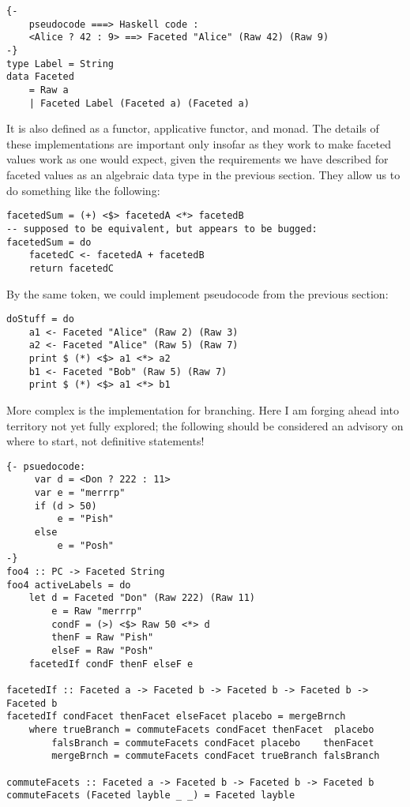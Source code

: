 \documentclass[12pt,a4paper]{article}
\begin{document}
	\lstset{language=Haskell}
	\begin{lstlisting}
{- 
	pseudocode ===> Haskell code :
	<Alice ? 42 : 9> ==> Faceted "Alice" (Raw 42) (Raw 9) 
-}
type Label = String
data Faceted
	= Raw a
	| Faceted Label (Faceted a) (Faceted a)
	\end{lstlisting}

	It is also defined as a functor, applicative functor, and monad. The details of these implementations are important only insofar as they work to make faceted values work as one would expect, given the requirements we have described for faceted values as an algebraic data type in the previous section. They allow us to do something like the following: 
	
	\begin{lstlisting}
facetedSum = (+) <$> facetedA <*> facetedB
-- supposed to be equivalent, but appears to be bugged:
facetedSum = do
	facetedC <- facetedA + facetedB
	return facetedC
	\end{lstlisting}
	
	By the same token, we could implement pseudocode from the previous section:
	
	\begin{lstlisting}
doStuff = do
	a1 <- Faceted "Alice" (Raw 2) (Raw 3)
	a2 <- Faceted "Alice" (Raw 5) (Raw 7)
	print $ (*) <$> a1 <*> a2
	b1 <- Faceted "Bob" (Raw 5) (Raw 7)
	print $ (*) <$> a1 <*> b1
	\end{lstlisting}
	
	More complex is the implementation for branching. Here I am forging ahead into territory not yet fully explored; the following should be considered an advisory on where to start, not definitive statements!
 
 \begin{lstlisting}
{- psuedocode:
	 var d = <Don ? 222 : 11>
	 var e = "merrrp"
	 if (d > 50)
		 e = "Pish"
	 else
		 e = "Posh"
-}
foo4 :: PC -> Faceted String 
foo4 activeLabels = do
	let d = Faceted "Don" (Raw 222) (Raw 11)
		e = Raw "merrrp"
		condF = (>) <$> Raw 50 <*> d
		thenF = Raw "Pish"
		elseF = Raw "Posh"
	facetedIf condF thenF elseF e

facetedIf :: Faceted a -> Faceted b -> Faceted b -> Faceted b -> Faceted b
facetedIf condFacet thenFacet elseFacet placebo = mergeBrnch
	where trueBranch = commuteFacets condFacet thenFacet  placebo
		falsBranch = commuteFacets condFacet placebo    thenFacet
		mergeBrnch = commuteFacets condFacet trueBranch falsBranch

commuteFacets :: Faceted a -> Faceted b -> Faceted b -> Faceted b
commuteFacets (Faceted layble _ _) = Faceted layble
 \end{lstlisting}
	
\end{document}
